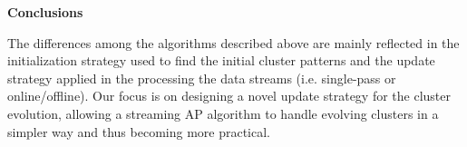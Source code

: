 


















\textbf{Conclusions}

The differences among the algorithms described above are mainly reflected in the initialization strategy used to find the initial cluster patterns and the update strategy applied in the processing the data streams (i.e. single-pass or online/offline). Our focus is on designing a novel update strategy for the cluster evolution, allowing a streaming AP algorithm to handle evolving clusters in a simpler way and thus becoming more practical. 

